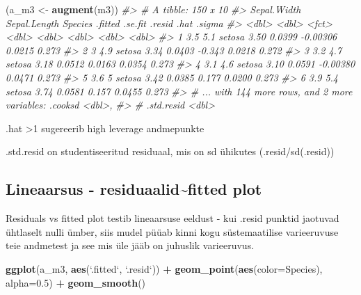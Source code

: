 \documentclass[]{book}
\newenvironment{Shaded}{\begin{snugshade}}{\end{snugshade}}
\newcommand{\KeywordTok}[1]{\textcolor[rgb]{0.13,0.29,0.53}{\textbf{#1}}}
\newcommand{\DataTypeTok}[1]{\textcolor[rgb]{0.13,0.29,0.53}{#1}}
\newcommand{\FloatTok}[1]{\textcolor[rgb]{0.00,0.00,0.81}{#1}}
\newcommand{\StringTok}[1]{\textcolor[rgb]{0.31,0.60,0.02}{#1}}
\newcommand{\CommentTok}[1]{\textcolor[rgb]{0.56,0.35,0.01}{\textit{#1}}}
\newcommand{\OperatorTok}[1]{\textcolor[rgb]{0.81,0.36,0.00}{\textbf{#1}}}
\newcommand{\NormalTok}[1]{#1}
\begin{document}
\begin{Shaded}
\begin{Highlighting}[]
\NormalTok{(a_m3 <-}\StringTok{ }\KeywordTok{augment}\NormalTok{(m3))}
\CommentTok{#> # A tibble: 150 x 10}
\CommentTok{#>   Sepal.Width Sepal.Length Species .fitted .se.fit   .resid   .hat .sigma}
\CommentTok{#>         <dbl>        <dbl> <fct>     <dbl>   <dbl>    <dbl>  <dbl>  <dbl>}
\CommentTok{#> 1         3.5          5.1 setosa     3.50  0.0399 -0.00306 0.0215  0.273}
\CommentTok{#> 2         3            4.9 setosa     3.34  0.0403 -0.343   0.0218  0.272}
\CommentTok{#> 3         3.2          4.7 setosa     3.18  0.0512  0.0163  0.0354  0.273}
\CommentTok{#> 4         3.1          4.6 setosa     3.10  0.0591 -0.00380 0.0471  0.273}
\CommentTok{#> 5         3.6          5   setosa     3.42  0.0385  0.177   0.0200  0.273}
\CommentTok{#> 6         3.9          5.4 setosa     3.74  0.0581  0.157   0.0455  0.273}
\CommentTok{#> # ... with 144 more rows, and 2 more variables: .cooksd <dbl>,}
\CommentTok{#> #   .std.resid <dbl>}
\end{Highlighting}
\end{Shaded}

.hat \textgreater{}1 sugereerib high leverage andmepunkte

.std.resid on studentiseeritud residuaal, mis on sd ühikutes
(.resid/sd(.resid))

\subsection*{Lineaarsus - residuaalid\textasciitilde{}fitted
plot}\label{lineaarsus---residuaalidfitted-plot}

Residuals vs fitted plot testib lineaarsuse eeldust - kui .resid punktid
jaotuvad ühtlaselt nulli ümber, siis mudel püüab kinni kogu
süstemaatilise varieeruvuse teie andmetest ja see mis üle jääb on
juhuslik varieeruvus.

\begin{Shaded}
\begin{Highlighting}[]
\KeywordTok{ggplot}\NormalTok{(a_m3, }\KeywordTok{aes}\NormalTok{(}\StringTok{`}\DataTypeTok{.fitted}\StringTok{`}\NormalTok{, }\StringTok{`}\DataTypeTok{.resid}\StringTok{`}\NormalTok{)) }\OperatorTok{+}\StringTok{ }
\StringTok{  }\KeywordTok{geom_point}\NormalTok{(}\KeywordTok{aes}\NormalTok{(}\DataTypeTok{color=}\NormalTok{Species), }\DataTypeTok{alpha=}\FloatTok{0.5}\NormalTok{) }\OperatorTok{+}\StringTok{ }
\StringTok{  }\KeywordTok{geom_smooth}\NormalTok{()}
\end{Highlighting}
\end{Shaded}
\end{document}
